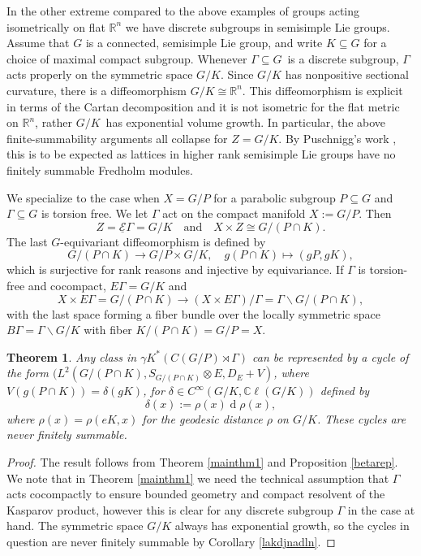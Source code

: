 \documentclass[a4paper,reqno]{amsart}
\numberwithin{equation}{section}
\def\rd{\operatorname{d}\!}
\def\C{\mathbb{C}}
\def\R{\mathbb{R}}
\newtheorem{thm}{Theorem}[section]
\theoremstyle{definition}
\theoremstyle{remark}
\begin{document}
In the other extreme compared to the above examples of groups acting isometrically on flat $\R^n$ we have discrete subgroups in semisimple Lie groups. Assume that $G$ is a connected, semisimple Lie group, and write $K\subseteq G$ for a choice of maximal compact subgroup. Whenever $\Gamma\subseteq G$ is a discrete subgroup, $\Gamma$ acts properly on the symmetric space $G/K$. Since $G/K$ has nonpositive sectional curvature, there is a diffeomorphism $G/K\cong \R^n$. This diffeomorphism is explicit in terms of the Cartan decomposition and it is not isometric for the flat metric on $\R^n$, rather $G/K$ has exponential volume growth. In particular,  the above finite-summability arguments all collapse for $Z=G/K$. By Puschnigg's work \cite{Pusch}, this is to be expected as lattices in higher rank semisimple Lie groups have no finitely summable Fredholm modules.

We specialize to the case when $X=G/P$ for a parabolic subgroup $P\subseteq G$ and $\Gamma\subseteq G$ is torsion free. We let $\Gamma$ act on the compact manifold $X:=G/P$. Then 
$$Z=\underline{\mathcal{E}}\Gamma=G/K \quad\mbox{and}\quad X\times Z\cong G/(P\cap K).$$
The last $G$-equivariant diffeomorphism is defined by 
$$G/(P\cap K)\to G/P\times G/K,\quad g(P\cap K)\mapsto (gP,gK),$$ 
which is surjective for rank reasons and injective by equivariance. If $\Gamma$ is torsion-free and cocompact, $E\Gamma=G/K$ and 
$$X\times E\Gamma=G/(P\cap K)\to (X\times E\Gamma)/\Gamma=\Gamma \backslash G/(P\cap K),$$
with the last space forming a fiber bundle over the locally symmetric space $B\Gamma=\Gamma\backslash G/K$ with fiber $K/(P\cap K)=G/P=X$.


\begin{thm}
Any class in $\gamma K^*(C(G/P)\rtimes \Gamma)$ can be represented by a cycle of the form $(L^2(G/(P\cap K),S_{G/(P\cap K)}\otimes E, D_E+V)$, where 
$V(g(P\cap K))=\delta(gK)$, 
for $\delta\in C^\infty(G/K,\C\ell(G/K))$ defined by
$$\delta(x):=\rho(x)\rd\rho(x),$$
where $\rho(x)=\rho(eK,x)$ for the geodesic distance $\rho$ on $G/K$. These cycles are never finitely summable.
\end{thm}


\begin{proof}
The result follows from Theorem \ref{mainthm1} and Proposition \ref{betarep}. We note that in Theorem \ref{mainthm1} we need the technical assumption that $\Gamma$ acts cocompactly to ensure bounded geometry and compact resolvent of the Kasparov product, however this is clear for any discrete subgroup $\Gamma$ in the case at hand. The symmetric space $G/K$ always has exponential growth, so the cycles in question are never finitely summable by Corollary \ref{lakdjnadln}.
\end{proof}
\end{document}
